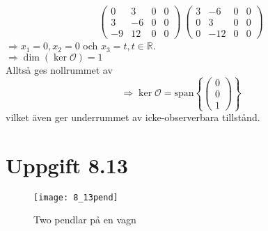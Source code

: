 \documentclass[12pt]{article}
\newcommand{\sspan}[1]{\mathrm{span}\left\{#1\right\}}
\begin{document}
\begin{equation*}
  \left(
  \begin{array}{ccc|c}
    0 & 3 & 0 & 0\\
    3 & -6 & 0 & 0 \\
    -9 & 12 & 0 & 0
  \end{array}\right) ~ 
\left(
  \begin{array}{ccc|c}
    3 & -6 & 0 & 0 \\
    0 & 3 & 0 & 0 \\
    0 & -12 & 0 & 0
  \end{array}
\right)
\end{equation*}
$\Rightarrow x_1 = 0, x_2 = 0$ och $x_3 = t, t \in \mathbb{R}$. \\
$\Rightarrow \dim{(\ker{\mathcal{O}})} = 1$ \\
Alltså ges nollrummet av
\[\Rightarrow \ker{\mathcal{O}} = \sspan{
  \begin{pmatrix}
    0 \\
    0 \\
    1
  \end{pmatrix}
}\]
vilket även ger underrummet av icke-observerbara tillstånd.

\section*{Uppgift 8.13}

\begin{figure}[h!]
  \centering
  \texttt{[image: 8\_13pend]}
  \caption{Two pendlar på en vagn}
  \label{fig:813pend}
\end{figure}
\end{document}
